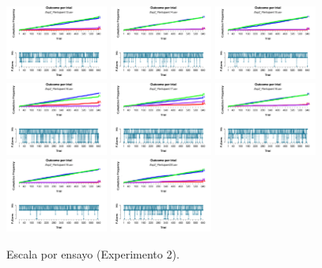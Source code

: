 \begin{figure}[th]
\includegraphics[width=0.30\textwidth]{Figures/Outcome_Exp2_P13} \includegraphics[width=0.30\textwidth]{Figures/Outcome_Exp2_P14} \includegraphics[width=0.30\textwidth]{Figures/Outcome_Exp2_P15}
\includegraphics[width=0.30\textwidth]{Figures/Outcome_Exp2_P16} \includegraphics[width=0.30\textwidth]{Figures/Outcome_Exp2_P17} \includegraphics[width=0.30\textwidth]{Figures/Outcome_Exp2_P18}
\includegraphics[width=0.30\textwidth]{Figures/Outcome_Exp2_P19} \includegraphics[width=0.30\textwidth]{Figures/Outcome_Exp2_P20} 
\caption[Rating_Exp2]{Escala por ensayo (Experimento 2).}
\label{fig:Rating_E2}
\end{figure}


